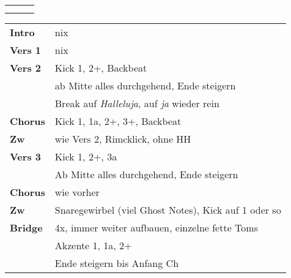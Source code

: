 

\begin{tabular}{p{0.6cm}p{12cm}p{1.4cm}}
	\rowcolor{cyan} \myRow{\thesongnumber} & \myRow{Golgatha} & \myRow{79} \\
	                                       &                  &            \\
\end{tabular}

\begin{tabular}{p{1.6cm}l}
	\textbf{Intro}  & nix                                                       \\
	\textbf{Vers 1} & nix                                                       \\
	\textbf{Vers 2} & Kick 1, 2+, Backbeat                                      \\
	                & ab Mitte alles \achtel durchgehend, Ende steigern         \\
	                & Break auf \textit{Halleluja}, auf \textit{ja} wieder rein \\
	\textbf{Chorus} & Kick 1, 1a, 2+, 3+, Backbeat                              \\
	\textbf{Zw}     & wie Vers 2, Rimcklick, ohne HH                            \\
	\textbf{Vers 3} & Kick 1, 2+, 3a                                            \\
	                & Ab Mitte alles \achtel durchgehend, Ende steigern         \\
	\textbf{Chorus} & wie vorher                                                \\
	\textbf{Zw}     & Snaregewirbel (viel Ghost Notes), Kick auf 1 oder so      \\
	\textbf{Bridge} & 4x, immer weiter aufbauen, einzelne fette Toms            \\
	                & Akzente 1, 1a, 2+                                         \\
	                & Ende \achtel steigern bis Anfang Ch                       \\

\end{tabular}

